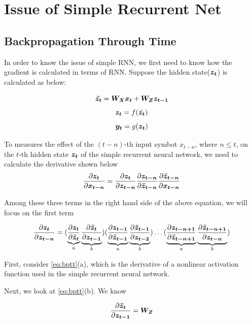 \section{Issue of Simple Recurrent Net}
\subsection{Backpropagation Through Time}
In order to know the issue of simple RNN, we first need to know how the gradient is calculated in terms of RNN. Suppose the hidden state($\vect{z_t}$) is calculated as below:

\[\vect{\bar{z_t}} = \matr{W_X} \vect{x_t} + \matr{W_Z} \vect{z_{t-1}}\]
\[\vect{z_t} = f(\bar{\vect{z_t}})\]
\[\vect{y_t} = g(\vect{z_t})\]

To measures the effect of the $(t-n)$-th input symbot $x_{t-n}$, where $n\leq{t}$, on the $t$-th hidden state $\vect{z_t}$ of the simple recurrent neural network, we need to calculate the derivative shown below
\[\frac{\partial \vect{z_t}}{\partial \vect{x_{t-n}}}=\frac{\partial \vect{z_t}}{\partial \vect{z_{t-n}}}\frac{\partial \vect{z_{t-n}}}{\partial \vect{\bar{z}_{t-n}}}\frac{\partial \vect{\bar{z}_{t-n}}}{\partial \vect{x_{t-n}}}\]

Among these three terms in the right hand side of the above equation, we will focus on the first term

\begin{equation} \label{eq:bptt}
\frac{\partial \vect{z_t}}{\partial \vect{z_{t-n}}} = (\underbrace{\frac{\partial \vect{z_t}}{\partial \vect{\bar{z}_{t}}}}_{a}\underbrace{\frac{\partial \vect{\bar{z}_{t}}}{\partial \vect{z_{t-1}}}}_{b})
(\underbrace{\frac{\partial \vect{z_{t-1}}}{\partial \vect{\bar{z}_{t-1}}}}_{a}\underbrace{\frac{\partial \vect{\bar{z}_{t-1}}}{\partial \vect{z_{t-2}}}}_{b}) \ldots 
(\underbrace{\frac{\partial \vect{z_{t-n+1}}}{\partial \vect{\bar{z}_{t-n+1}}}}_{a}\underbrace{\frac{\partial \vect{\bar{z}_{t-n+1}}}{\partial \vect{z_{t-n}}}}_{b})
\end{equation}

First, consider \cref{eq:bptt}(a), which is the derivative of a nonlinear activation function used in the simple recurrent neural network.

Next, we look at \cref{eq:bptt}(b). We know

\[\frac{\partial \vect{\bar{z}_{t}}}{\partial \vect{z_{t-1}}} = \matr{W_Z}\]

